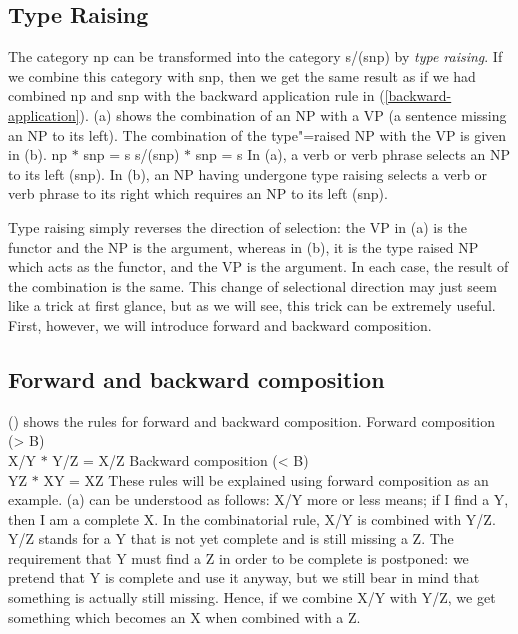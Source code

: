 \subsection{Type Raising}
\label{sec-typeraising}

\addlines
The category np can be transformed into the category s/(s\bs np) by \emph{type raising}. If we combine this category with s\bs np, then we get the same result as if we had
combined np and s\bs np with the backward application rule in
(\ref{backward-application}). (a) shows the combination of an NP with a VP (a sentence
missing an NP to its left). The combination of the type"=raised NP with the VP is given in
(b). 
\eal
\ex np $*$ s\bs np = s 
\ex s/(s\bs np) $*$ s\bs np = s
\zl
In (a), a verb or verb phrase selects an NP to its left (s\bs np). In (b), an NP
having undergone type raising selects a verb or verb phrase to its right which requires an NP to its
left (s\bs np).  

Type raising simply reverses the direction of selection: the VP in (a) is the functor and the
NP is the argument, whereas in (b), it is the type raised NP which acts as the functor, and
the VP is the argument. In each case, the result of the combination is the same. This change of
selectional direction may just seem like a trick at first glance, but as we will see, this trick can
be extremely useful. First, however, we will introduce forward and backward composition.

\subsection{Forward and backward composition}
\label{Kategorialgrammatik-Komposition}

() shows the rules for forward and backward composition.
\eal
\ex\label{Regel-Vorwaertskomposition}
 Forward composition (> B)\\
    X/Y $*$ Y/Z = X/Z 
\ex Backward composition (< B)\\
    Y\bs Z $*$ X\bs Y = X\bs Z
\zl 
These rules will be explained using forward composition as an example. (a) can be understood as follows: X/Y more or less means; if I find a Y, then I am a complete X.
In the combinatorial rule, X/Y is combined with Y/Z. Y/Z stands for a Y that is not yet complete and is
still missing a Z. The requirement that Y must find a Z in order
to be complete is postponed: we pretend that Y is complete and use it anyway, but we still bear in mind that
something is actually still missing. Hence, if we combine X/Y with Y/Z, we get something which becomes an X when combined with a Z. 

